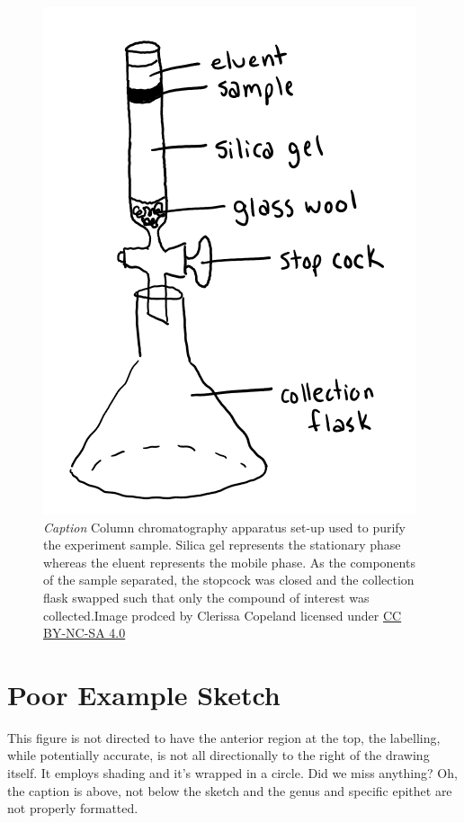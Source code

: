\documentclass[
]{book}
\begin{document}
\begin{figure}
\centering
\includegraphics{images/JSSG_good-journal-style-fig-2.png}
\caption{\emph{Caption} Column chromatography apparatus set-up used to purify the experiment sample. Silica gel represents the stationary phase whereas the eluent represents the mobile phase. As the components of the sample separated, the stopcock was closed and the collection flask swapped such that only the compound of interest was collected.Image prodced by Clerissa Copeland licensed under \href{https://creativecommons.org/licenses/by-nc-sa/4.0/}{CC BY-NC-SA 4.0}}
\end{figure}

\hypertarget{poor-example-sketch}{%
\section{Poor Example Sketch}\label{poor-example-sketch}}

This figure is not directed to have the anterior region at the top, the labelling, while potentially accurate, is not all directionally to the right of the drawing itself. It employs shading and it's wrapped in a circle. Did we miss anything? Oh, the caption is above, not below the sketch and the genus and specific epithet are not properly formatted.
\end{document}
